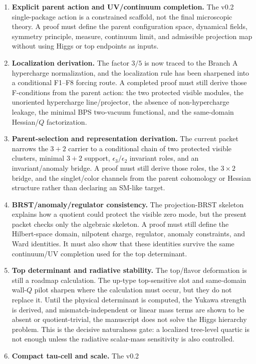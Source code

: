 \documentclass[11pt]{article}
\begin{document}
\begin{enumerate}
\item \textbf{Explicit parent action and UV/continuum completion.} The v0.2
single-package action is a constrained scaffold, not the final microscopic
theory. A proof must define the parent configuration space, dynamical fields,
symmetry principle, measure, continuum limit, and admissible projection map
without using Higgs or top endpoints as inputs.
\item \textbf{Localization derivation.} The factor $3/5$ is now traced to
the Branch A hypercharge normalization, and the localization rule has been
sharpened into a conditional F1--F8 forcing route.  A completed proof must
still derive those F-conditions from the parent action: the two protected
visible modules, the unoriented hypercharge line/projector, the absence of
non-hypercharge leakage, the minimal BPS two-vacuum functional, and the
same-domain Hessian/$Q$ factorization.
\item \textbf{Parent-selection and representation derivation.} The current
packet narrows the $3+2$ carrier to a conditional chain of two protected
visible clusters, minimal $3+2$ support, $\epsilon_3/\epsilon_2$ invariant
roles, and an invariant/anomaly bridge. A proof must still derive those roles,
the $3\times2$ bridge, and the singlet/color channels from the parent
cohomology or Hessian structure rather than declaring an SM-like target.
\item \textbf{BRST/anomaly/regulator consistency.} The projection-BRST
skeleton explains how a quotient could protect the visible zero mode, but the
present packet checks only the algebraic skeleton. A proof must still define
the Hilbert-space domain, nilpotent charge, regulator, anomaly constraints, and
Ward identities. It must also show that these identities survive the same
continuum/UV completion used for the top determinant.
\item \textbf{Top determinant and radiative stability.} The top/flavor
deformation is still a roadmap calculation. The up-type top-sensitive slot and
same-domain wall-$Q$ pilot sharpen where the calculation must occur, but they
do not replace it. Until the physical determinant is computed, the Yukawa
strength is derived, and mismatch-independent or linear mass terms are shown to
be absent or quotient-trivial, the manuscript does not solve the Higgs
hierarchy problem. This is the decisive naturalness gate: a localized tree-level
quartic is not enough unless the radiative scalar-mass sensitivity is also
controlled.
\item \textbf{Compact tau-cell and scale.} The v0.2

\end{enumerate}
\end{document}
